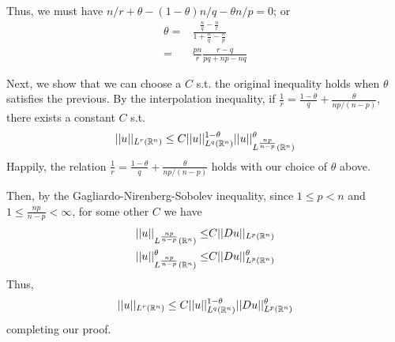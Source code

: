Thus, we must have $n / r + \theta - (1 - \theta) n / q - \theta n / p = 0$; or
\begin{align*}
\theta = &\frac{\frac{n}{q} - \frac{n}{r}}{1 + \frac{n}{q} - \frac{n}{p}}\\
       = &\frac{p n}{r} \frac{r - q}{p q + n p - n q}
\end{align*}

Next, we show that we can choose a $C$ s.t. the original inequality holds when $\theta$ satisfies the previous.
By the interpolation inequality, if $\frac{1}{r} = \frac{1 - \theta}{q} + \frac{\theta}{n p / (n - p)}$,
there exists a constant $C$ s.t.
\begin{align*}
||u||_{L^{r}(\mathbb{R}^n)} \leq C ||u||_{L^{q}(\mathbb{R}^n)}^{1 - \theta} ||u||_{L^{\frac{n p}{n - p}}(\mathbb{R}^n)}^{\theta}
\end{align*}
Happily, the relation $\frac{1}{r} = \frac{1 - \theta}{q} + \frac{\theta}{n p / (n - p)}$
holds with our choice of $\theta$ above.

Then, by the Gagliardo-Nirenberg-Sobolev inequality, since $1 \leq p < n$ and $1 \leq \frac{n p}{n - p} < \infty$,
for some other $C$ we have
\begin{align*}
||u||_{L^{\frac{n p}{n - p}}(\mathbb{R}^n)} \leq &C ||D u||_{L^p(\mathbb{R}^n)}\\
||u||_{L^{\frac{n p}{n - p}}(\mathbb{R}^n)}^{\theta} \leq &C ||D u||_{L^p(\mathbb{R}^n)}^\theta
\end{align*}
Thus,
\begin{align*}
||u||_{L^{r}(\mathbb{R}^n)} \leq C ||u||_{L^{q}(\mathbb{R}^n)}^{1 - \theta} ||D u||_{L^{p}(\mathbb{R}^n)}^\theta
\end{align*}
completing our proof.
